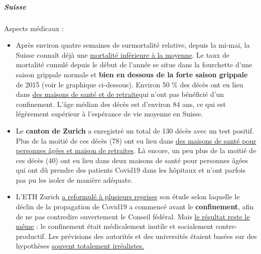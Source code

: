 \hypertarget{suisse}{%
\subparagraph{\texorpdfstring{\textbf{Suisse}}{Suisse}}\label{suisse}}

Aspects médicaux :

\begin{itemize}
\tightlist
\item
  Après environ quatre semaines de surmortalité relative, depuis la
  mi-mai, la Suisse connaît déjà une
  \href{https://swprs.files.wordpress.com/2020/06/schweiz-todesfaelle-2010-2020_woche_20.pdf}{mortalité
  inférieure à la moyenne}. Le taux de mortalité cumulé depuis le début
  de l'année se situe dans la fourchette d'une saison grippale normale
  et \textbf{bien en dessous de la forte saison grippale} de 2015 (voir
  le graphique ci-dessous). Environ 50 \% des décès ont eu lieu dans
  \href{https://www.nzz.ch/zuerich/coronavirus-zuerich-aendert-nun-das-testregime-in-heimenauch-viele-aeltere-covid-19-infizierte-entwickeln-keine-symptome-zuerich-aendert-nun-das-testregime-in-heimen-ld.1552089}{des
  maisons de santé et de retraite}qui n'ont pas bénéficié d'un
  confinement. L'âge médian des décès est d'environ 84 ans, ce qui est
  légèrement supérieur à l'espérance de vie moyenne en Suisse.
\item
  Le \textbf{canton de Zurich} a enregistré un total de 130 décès avec
  un test positif. Plus de la moitié de ces décès (78) ont eu lieu dans
  \href{https://www.republik.ch/2020/05/28/toedlicher-zufall}{des
  maisons de santé pour personnes âgées et maison de retraites}. Là
  encore, un peu plus de la moitié de ces décès (40) ont eu lieu dans
  deux maisons de santé pour personnes âgées qui ont dû prendre des
  patients Covid19 dans les hôpitaux et n'ont parfois pas pu les isoler
  de manière adéquate.
\item
  L'ETH Zurich
  \href{https://www.luzernerzeitung.ch/schweiz/die-schweiz-haette-die-kurve-auch-mit-weniger-einschraenkungen-gekriegt-war-der-lockdown-uebertrieben-ld.1221111}{a
  reformulé à plusieurs reprises} son étude selon laquelle le déclin de
  la propagation de Covid19 a commencé avant le \textbf{confinement},
  afin de ne pas contredire ouvertement le Conseil fédéral. Mais
  \href{https://infekt.ch/2020/04/sind-wir-tatsaechlich-im-blindflug/}{le
  résultat reste le même} : le confinement était médicalement inutile et
  socialement contre-productif. Les prévisions des autorités et des
  universités étaient basées sur des hypothèses
  \href{https://www.cash.ch/news/politik/coronavirus-schweizer-wissenschaftler-warnen-vor-knappheit-bei-spitalbetten-1511778}{souvent
  totalement irréalistes.}

\end{itemize}
